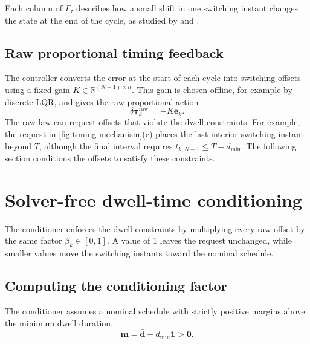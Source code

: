 \documentclass[pdflatex,iicol,sn-mathphys-ay]{sn-jnl}
\newcommand{\R}{\mathbb{R}}
\newcommand{\vect}[1]{\bm{#1}}
\newcommand{\dtau}{\delta\vect{\tau}}
\begin{document}
Each column of $\Gamma_\tau$ describes how a small shift in one switching instant changes the state at the end of the cycle, as studied by \cite{patino2010} and \cite{flieller2006limitCycles}.

\subsection{Raw proportional timing feedback}

The controller converts the error at the start of each cycle into switching offsets using a fixed gain $K\in\R^{(N-1)\times n}$. This gain is chosen offline, for example by discrete LQR, and gives the raw proportional action
\begin{equation}
    \dtau_k^{\mathrm{raw}}=-K\vect{e}_k.
    \label{eq:raw-law}
\end{equation}
The raw law can request offsets that violate the dwell constraints. For example, the request in \cref{fig:timing-mechanism}(c) places the last interior switching instant beyond $T$, although the final interval requires $t_{k,N-1}\le T-d_{\min}$. The following section conditions the offsets to satisfy these constraints.

\section{Solver-free dwell-time conditioning}
\label{sec:conditioning}

The conditioner enforces the dwell constraints by multiplying every raw offset by the same factor $\beta_k\in[0,1]$. A value of 1 leaves the request unchanged, while smaller values move the switching instants toward the nominal schedule.

\subsection{Computing the conditioning factor}

The conditioner assumes a nominal schedule with strictly positive margins above the minimum dwell duration,
\begin{equation}
    \vect{m}=\bar{\vect{d}}-d_{\min}\vect{1}>\vect{0}.
    \label{eq:strict-margin}
\end{equation}
\end{document}
